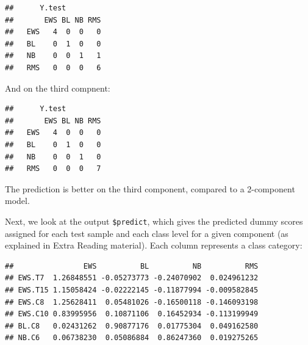 \documentclass[]{book}
\newenvironment{Shaded}{\begin{snugshade}}{\end{snugshade}}
\newcommand{\KeywordTok}[1]{\textcolor[rgb]{0.13,0.29,0.53}{\textbf{#1}}}
\newcommand{\DataTypeTok}[1]{\textcolor[rgb]{0.13,0.29,0.53}{#1}}
\newcommand{\DecValTok}[1]{\textcolor[rgb]{0.00,0.00,0.81}{#1}}
\newcommand{\StringTok}[1]{\textcolor[rgb]{0.31,0.60,0.02}{#1}}
\newcommand{\CommentTok}[1]{\textcolor[rgb]{0.56,0.35,0.01}{\textit{#1}}}
\newcommand{\OperatorTok}[1]{\textcolor[rgb]{0.81,0.36,0.00}{\textbf{#1}}}
\newcommand{\NormalTok}[1]{#1}
\begin{document}
\begin{verbatim}
##      Y.test
##       EWS BL NB RMS
##   EWS   4  0  0   0
##   BL    0  1  0   0
##   NB    0  0  1   1
##   RMS   0  0  0   6
\end{verbatim}

And on the third compnent:

\begin{Shaded}
\end{Shaded}

\begin{verbatim}
##      Y.test
##       EWS BL NB RMS
##   EWS   4  0  0   0
##   BL    0  1  0   0
##   NB    0  0  1   0
##   RMS   0  0  0   7
\end{verbatim}

The prediction is better on the third component, compared to a
2-component model.

Next, we look at the output \texttt{\$predict}, which gives the
predicted dummy scores assigned for each test sample and each class
level for a given component (as explained in Extra Reading material).
Each column represents a class category:

\begin{Shaded}
\end{Shaded}

\begin{verbatim}
##                EWS          BL          NB          RMS
## EWS.T7  1.26848551 -0.05273773 -0.24070902  0.024961232
## EWS.T15 1.15058424 -0.02222145 -0.11877994 -0.009582845
## EWS.C8  1.25628411  0.05481026 -0.16500118 -0.146093198
## EWS.C10 0.83995956  0.10871106  0.16452934 -0.113199949
## BL.C8   0.02431262  0.90877176  0.01775304  0.049162580
## NB.C6   0.06738230  0.05086884  0.86247360  0.019275265
\end{verbatim}
\end{document}
